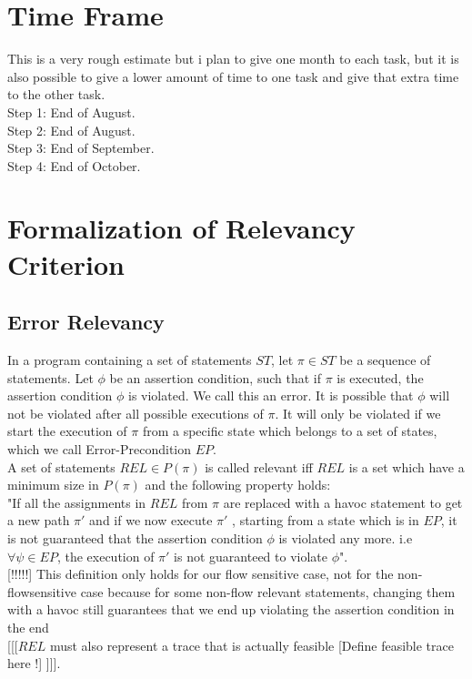 \documentclass{article}
\begin{document}
\section{Time Frame}
This is a very rough estimate but i plan to give one month to each task, but it is also possible to give a lower amount of time to one task and give that extra time to the other task.\\
Step 1: End of August.\\
Step 2: End of August.\\
Step 3: End of September.\\
Step 4: End of October.
\newpage
\section{Formalization of Relevancy Criterion}
\subsection{Error Relevancy}
In a program containing a set of statements $ST$, let $\pi \in ST$ be a sequence of statements. Let $\phi$ be an assertion condition, such that if $\pi$ is executed, the assertion condition $\phi$ is violated. We call this an error. It is possible that $\phi$ will not be violated after all possible executions of $\pi$. It will only be violated if we start the execution of $\pi$ from a specific state which belongs to a set of states, which we call Error-Precondition $EP$.\\
A set of statements $REL \in {P}(\pi)$ is called relevant iff $REL$ is a set which have a minimum size in ${P}(\pi)$ and the following property holds:
\\ "If all the assignments in $REL$ from $\pi$ are replaced with a havoc statement to get a new path $\pi'$ and if we now execute $\pi'$ , starting from a state which is in $EP$, it is not guaranteed that the assertion condition $\phi$ is violated any more. i.e $ \forall  \psi \in EP$, the execution of  $\pi'$  is not guaranteed to violate $\phi$". 
\\
{\tiny [!!!!!] This definition only holds for our flow sensitive case, not for the non-flowsensitive case because for some non-flow relevant statements, changing them with a havoc still guarantees that we end up violating the assertion condition in the end}
\\
{\tiny [[[$REL$ must also represent a trace that is actually feasible [Define feasible trace here !] ]]].}
\end{document}
